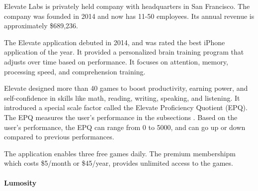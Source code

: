 \documentclass[letterpaper,10pt]{article}
\begin{document}

Elevate Labs is privately held company with headquarters in San Francisco. The company was founded in 2014 and now has 11-50 employees. Its annual revenue is approximately \$689,236. \cite{mergent_intellect}

\cite{mergent_intellect}

The Elevate application debuted in 2014, and was rated the best iPhone application of the year. It provided a personalized brain training program that adjusts over time based on performance. It focuses on attention, memory, processing speed, and comprehension training.


Elevate designed more than 40 games to boost productivity, earning power, and self-confidence in skills like math, reading, writing, speaking, and listening. It introduced a special scale factor called the Elevate Proficiency Quotient (EPQ). The EPQ measures the user’s performance in the subsections . Based on the user’s performance, the EPQ can range from 0 to 5000, and can go up or down compared to previous performances.


The application enables three free games daily. The premium membershipm which costs \$5/month or \$45/year, provides unlimited access to the games.

\cite{elevateapp}

\paragraph{Lumosity}
\end{document}

